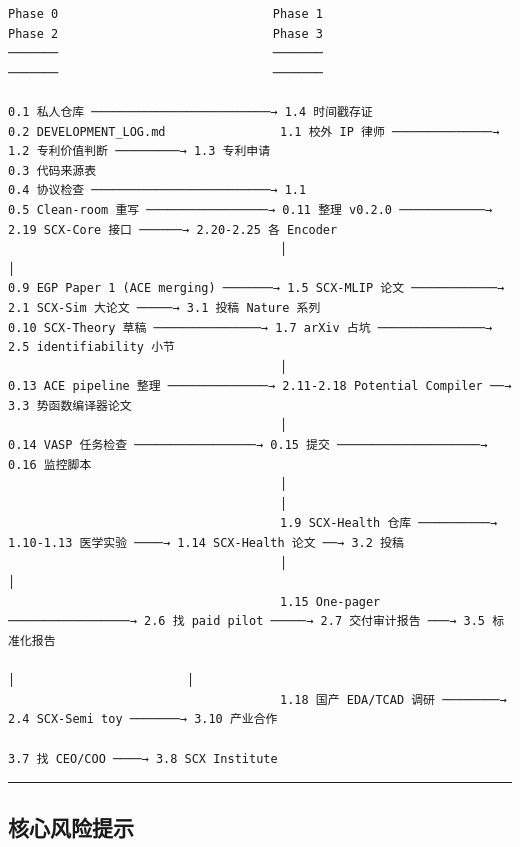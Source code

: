 \documentclass[
  12pt,
]{ctexart}
\begin{document}
\begin{verbatim}
Phase 0                              Phase 1                          Phase 2                              Phase 3
───────                              ───────                          ───────                              ───────

0.1 私人仓库 ─────────────────────────→ 1.4 时间戳存证
0.2 DEVELOPMENT_LOG.md                1.1 校外 IP 律师 ──────────────→ 1.2 专利价值判断 ─────────→ 1.3 专利申请
0.3 代码来源表
0.4 协议检查 ─────────────────────────→ 1.1
0.5 Clean-room 重写 ─────────────────→ 0.11 整理 v0.2.0 ────────────→ 2.19 SCX-Core 接口 ──────→ 2.20-2.25 各 Encoder
                                      │                                    │
0.9 EGP Paper 1 (ACE merging) ───────→ 1.5 SCX-MLIP 论文 ────────────→ 2.1 SCX-Sim 大论文 ─────→ 3.1 投稿 Nature 系列
0.10 SCX-Theory 草稿 ───────────────→ 1.7 arXiv 占坑 ───────────────→ 2.5 identifiability 小节
                                      │
0.13 ACE pipeline 整理 ──────────────→ 2.11-2.18 Potential Compiler ──→ 3.3 势函数编译器论文
                                      │
0.14 VASP 任务检查 ─────────────────→ 0.15 提交 ────────────────────→ 0.16 监控脚本
                                      │
                                      │
                                      1.9 SCX-Health 仓库 ──────────→ 1.10-1.13 医学实验 ────→ 1.14 SCX-Health 论文 ──→ 3.2 投稿
                                      │                                │
                                      1.15 One-pager ─────────────────→ 2.6 找 paid pilot ─────→ 2.7 交付审计报告 ───→ 3.5 标准化报告
                                                                        │                        │
                                      1.18 国产 EDA/TCAD 调研 ────────→ 2.4 SCX-Semi toy ───────→ 3.10 产业合作
                                                                                                3.7 找 CEO/COO ────→ 3.8 SCX Institute
\end{verbatim}

\begin{center}\rule{0.5\linewidth}{0.5pt}\end{center}

\subsection{核心风险提示}\label{ux6838ux5fc3ux98ceux9669ux63d0ux793a}
\end{document}
